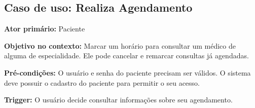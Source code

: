 \documentclass[11pt,a4paper]{report}
\begin{document}
\subsection{Caso de uso: Realiza Agendamento} 

\textbf{Ator primário:} Paciente \newline

\textbf{Objetivo no contexto:} Marcar um horário para consultar um médico de alguma de especialidade. Ele pode cancelar e remarcar consultas já agendadas.\newline

\textbf{Pré-condições:}  O usuário e senha do paciente precisam ser válidos. O sistema deve possuir o cadastro do paciente para permitir o seu acesso.\newline

\textbf{Trigger:} O usuário decide consultar informações sobre seu agendamento.\newline
\end{document}
